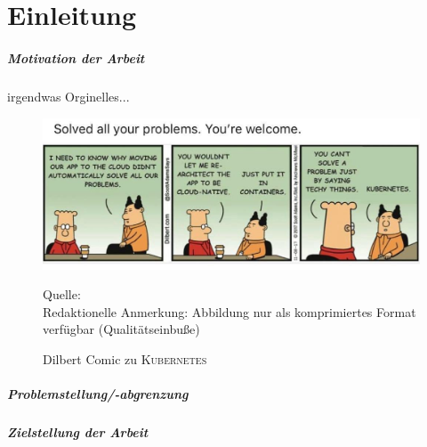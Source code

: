 \acresetall 
{} %
\chapter{Einleitung}
\paragraph{Motivation der Arbeit}
irgendwas Orginelles...
\begin{figure}[H]
	\centering
	\includegraphics[scale=0.33]{img/dilbertCloud.jpeg}
	\caption{Dilbert Comic zu \textsc{Kubernetes}}
	{\footnotesize Quelle: \cite{DilbertKubernetes} \\ Redaktionelle Anmerkung: Abbildung nur als komprimiertes Format verfügbar (Qualitätseinbuße)}
\end{figure}

\paragraph{Problemstellung/-abgrenzung}

\paragraph{Zielstellung der Arbeit}

